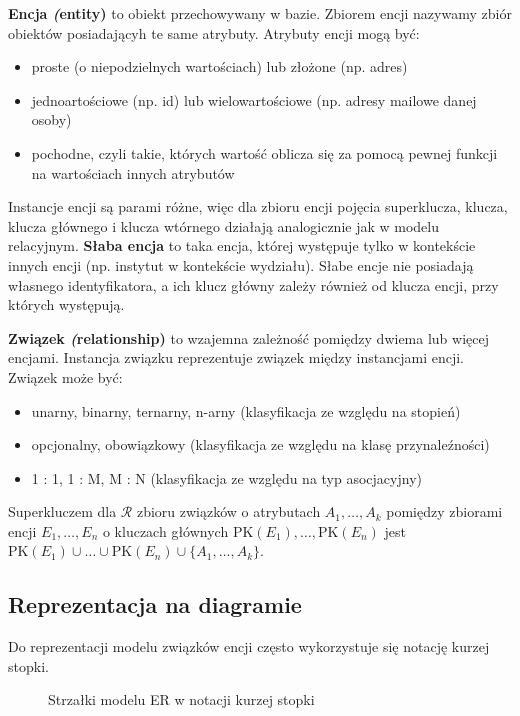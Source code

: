\textbf{Encja \textit(entity)} to obiekt przechowywany w bazie. Zbiorem encji nazywamy zbiór obiektów posiadającyh te same atrybuty.
Atrybuty encji mogą być:
\begin{itemize}
    \item proste (o niepodzielnych wartościach) lub złożone (np. adres)
    \item jednoartościowe (np. id) lub wielowartościowe (np. adresy mailowe danej osoby)
    \item pochodne, czyli takie, których wartość oblicza się za pomocą pewnej funkcji na wartościach innych atrybutów
\end{itemize}
Instancje encji są parami różne, więc dla zbioru encji pojęcia superklucza, klucza, klucza głównego i klucza wtórnego działają analogicznie jak
w modelu relacyjnym.
\textbf{Słaba encja} to taka encja, której występuje tylko w kontekście innych encji (np. instytut w kontekście wydziału). Słabe encje nie posiadają własnego identyfikatora, a ich klucz główny zależy również od klucza encji, przy których występują.

\textbf{Związek \textit(relationship)} to wzajemna zależność pomiędzy dwiema lub więcej encjami. Instancja związku reprezentuje związek między instancjami encji.
Związek może być:
\begin{itemize}
    \item unarny, binarny, ternarny, n-arny (klasyfikacja ze względu na stopień)
    \item opcjonalny, obowiązkowy (klasyfikacja ze względu na klasę przynaleźności)
    \item 1 : 1, 1 : M, M : N (klasyfikacja ze względu na typ asocjacyjny)
\end{itemize}
Superkluczem dla \( \mathcal{R} \) zbioru związków o atrybutach \( A_1, \dots, A_k \) pomiędzy zbiorami encji \( E_1, \dots, E_n \) o kluczach głównych \( \text{PK}(E_1), \dots, \text{PK}(E_n) \)
jest \( \text{PK}(E_1) \cup \ldots \cup \text{PK}(E_n) \cup \{A_1, \dots, A_k\} \).

\subsection*{Reprezentacja na diagramie}
Do reprezentacji modelu związków encji często wykorzystuje się notację kurzej stopki.

\begin{figure}[h!]
    \centering
    
    \caption{Strzałki modelu ER w notacji kurzej stopki}
\end{figure}